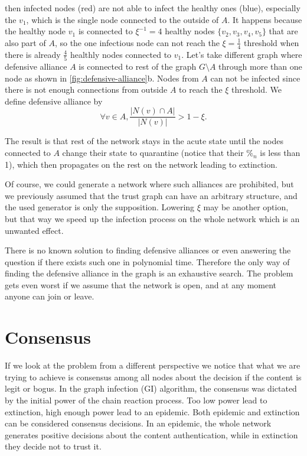 \documentclass[nostrict]{szablonPG}
\begin{document}
then infected nodes (red) are not able to infect the healthy ones (blue), especially the $v_1$, which is the single node connected to the outside of $A$. It happens because the healthy node $v_1$ is connected to $\xi^{-1} = 4$ healthy nodes $\{v_2,v_3,v_4,v_5\}$ that are also part of $A$, so the one infectious node can not reach the $\xi = \frac{1}{4}$ threshold when there is already $\frac{4}{5}$ healthly nodes connected to $v_1$.
Let's take different graph where defensive alliance $A$ is connected to rest of the graph $G \setminus A$ through more than one node as shown in \ref{fig:defensive-alliance}b. Nodes from $A$ can not be infected since there is not enough connections from outside $A$ to reach the $\xi$ threshold. We define defensive alliance by \[\forall{v \in A}, \frac{|N(v) \cap A|}{|N(v)|} > 1 - \xi.\]

The result is that rest of the network stays in the acute state until the nodes connected to $A$ change their state to quarantine (notice that their $\%_n$ is less than 1), which then propagates on the rest on the network leading to extinction. 

Of course, we could generate a network where such alliances are prohibited, but we previously assumed that the trust graph can have an arbitrary structure, and the used generator is only the supposition. Lowering $\xi$ may be another option, but that way we speed up the infection process on the whole network which is an unwanted effect.

There is no known solution to finding defensive alliances or even answering the question if there exists such one in polynomial time. Therefore the only way of finding the defensive alliance in the graph is an exhaustive search. The problem gets even worst if we assume that the network is open, and at any moment anyone can join or leave. 

\section{Consensus}
If we look at the problem from a different perspective we notice that what we are trying to achieve is consensus among all nodes about the decision if the content is legit or bogus. In the graph infection (GI) algorithm, the consensus was dictated by the initial power of the chain reaction process. Too low power lead to extinction, high enough power lead to an epidemic. Both epidemic and extinction can be considered consensus decisions. In an epidemic, the whole network generates positive decisions about the content authentication, while in extinction they decide not to trust it. 
\end{document}
